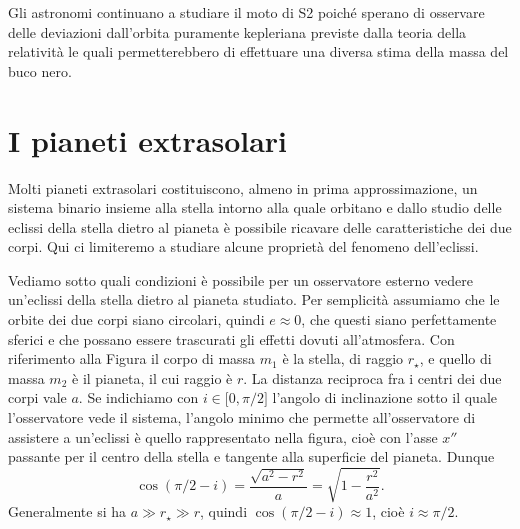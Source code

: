Gli astronomi continuano a studiare il moto di S2 poiché sperano di osservare
delle deviazioni dall'orbita puramente kepleriana previste dalla teoria della
relatività le quali permetterebbero di effettuare una diversa stima della massa
del buco nero.

\section{I pianeti extrasolari}
\label{sec:extrasolari}

Molti pianeti extrasolari costituiscono, almeno in prima approssimazione, un
sistema binario insieme alla stella intorno alla quale orbitano e dallo studio
delle eclissi della stella dietro al pianeta è possibile ricavare delle
caratteristiche dei due corpi. Qui ci limiteremo a studiare alcune proprietà del
fenomeno dell'eclissi.

Vediamo sotto quali condizioni è possibile per un osservatore esterno vedere
un'eclissi della stella dietro al pianeta studiato. Per semplicità assumiamo che
le orbite dei due corpi siano circolari, quindi $e \approx 0$, che questi siano
perfettamente sferici e che possano essere trascurati gli effetti dovuti
all'atmosfera. Con riferimento alla Figura %
il corpo di massa $m_1$ è la stella, di raggio $r_\star$, e quello di massa
$m_2$ è il pianeta, il cui raggio è $r$. La distanza reciproca fra i centri dei
due corpi vale $a$. Se indichiamo con $i \in \mathopen{[}0, \pi/2\mathclose{]}$
l'angolo di inclinazione sotto il quale l'osservatore vede il sistema, l'angolo
minimo che permette all'osservatore di assistere a un'eclissi è quello
rappresentato nella figura, cioè con l'asse $x''$ passante per il centro della
stella e tangente alla superficie del pianeta. Dunque
\begin{equation}
  \cos(\pi/2 - i) = \frac{\sqrt{a^2 - r^2}}{a} = \sqrt{1 - \frac{r^2}{a^2}}.
\end{equation}
Generalmente si ha $a \gg r_\star \gg r$, quindi $\cos(\pi/2 - i) \approx 1$,
cioè $i \approx \pi/2$.

